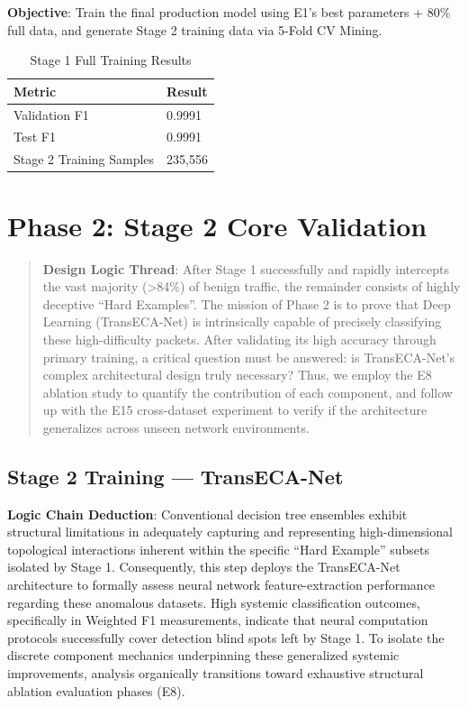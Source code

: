 \documentclass[sigconf]{acmart}
\begin{document}
\textbf{Objective}: Train the final production model using E1's best parameters + 80\% full data, and generate Stage 2 training data via 5-Fold CV Mining.

\begin{table}[H]
\caption{Stage 1 Full Training Results}
\label{tab:s1_full}
\begin{tabular}{ll}
\toprule
\textbf{Metric} & \textbf{Result} \\
\midrule
Validation F1 & 0.9991 \\
Test F1 & 0.9991 \\
Stage 2 Training Samples & 235,556 \\
\bottomrule
\end{tabular}
\end{table}

\section{Phase 2: Stage 2 Core Validation}
\begin{quote}
\textbf{Design Logic Thread}: After Stage 1 successfully and rapidly intercepts the vast majority (>84\%) of benign traffic, the remainder consists of highly deceptive ``Hard Examples''. The mission of Phase 2 is to prove that Deep Learning (TransECA-Net) is intrinsically capable of precisely classifying these high-difficulty packets. After validating its high accuracy through primary training, a critical question must be answered: is TransECA-Net's complex architectural design truly necessary? Thus, we employ the E8 ablation study to quantify the contribution of each component, and follow up with the E15 cross-dataset experiment to verify if the architecture generalizes across unseen network environments.
\end{quote}

\subsection{Stage 2 Training --- TransECA-Net}
\textbf{Logic Chain Deduction}: Conventional decision tree ensembles exhibit structural limitations in adequately capturing and representing high-dimensional topological interactions inherent within the specific ``Hard Example'' subsets isolated by Stage 1. Consequently, this step deploys the TransECA-Net architecture to formally assess neural network feature-extraction performance regarding these anomalous datasets. High systemic classification outcomes, specifically in Weighted F1 measurements, indicate that neural computation protocols successfully cover detection blind spots left by Stage 1. To isolate the discrete component mechanics underpinning these generalized systemic improvements, analysis organically transitions toward exhaustive structural ablation evaluation phases (E8).
\end{document}
